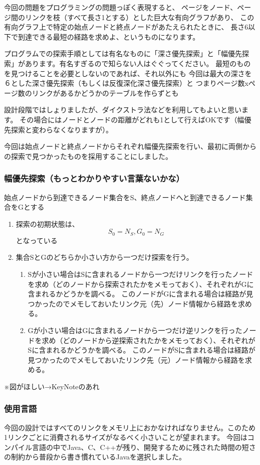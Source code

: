 \documentclass{jsarticle}
\begin{document}
今回の問題をプログラミングの問題っぽく表現すると、
ページをノード、ページ間のリンクを枝（すべて長さ1とする）とした巨大な有向グラフがあり、
この有向グラフ上で特定の始点ノードと終点ノードがあたえられたときに、
長さ6以下で到達できる最短の経路を求めよ、というものになります。

プログラムでの探索手順としては有名なものに「深さ優先探索」と「幅優先探索」があります。有名すぎるので知らない人はぐぐってください。
最短のものを見つけることを必要としないのであれば、それ以外にも
今回は最大の深さを６とした深さ優先探索（もしくは反復深化深さ優先探索）と
つまりページ数xページ数のリンクがあるかどうかのテーブルを作らずとも

設計段階ではしょりましたが、ダイクストラ法などを利用してもよいと思います。
その場合にはノードとノードの距離がどれも1として行えばOKです（幅優先探索と変わらなくなりますが）。

今回は始点ノードと終点ノードからそれぞれ幅優先探索を行い、最初に両側からの探索で見つかったものを採用することにしました。

\subsubsection{幅優先探索（もっとわかりやすい言葉ないかな）}
始点ノードから到達できるノード集合をS、終点ノードへと到達できるノード集合をGとする
\begin{enumerate}
\item 探索の初期状態は、
\[
S_0 = {N_S}, G_0 = {N_G}
\]
となっている
\item 集合SとGのどちらか小さい方から一つだけ探索を行う。
  \begin{enumerate}
    \item Sが小さい場合はSに含まれるノードから一つだけリンクを行ったノードを求め（どのノードから探索されたかをメモっておく）、それぞれがGに含まれるかどうかを調べる。
      このノードがGに含まれる場合は経路が見つかったのでメモしておいたリンク元（先）ノード情報から経路を求める。
    \item Gが小さい場合はGに含まれるノードから一つだけ逆リンクを行ったノードを求め（どのノードから逆探索されたかをメモっておく）、それぞれがSに含まれるかどうかを調べる。
      このノードがSに含まれる場合は経路が見つかったのでメモしておいたリンク先（元）ノード情報から経路を求める。
  \end{enumerate}
\end{enumerate}
※図がほしい→KeyNoteのあれ

\subsubsection{使用言語}
今回の設計ではすべてのリンクをメモリ上におかなければなりません。このため1リンクごとに消費されるサイズがなるべく小さいことが望まれます。
今回はコンパイル言語の中でJava、C、C++が残り、開発するために残された時間の短さの制約から普段から書き慣れているJavaを選択しました。
\end{document}
